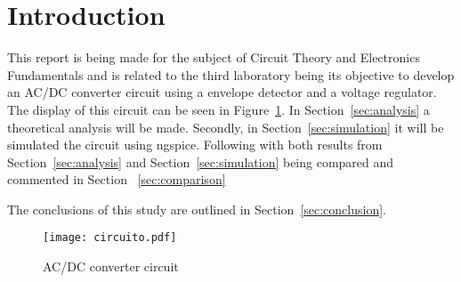 \section{Introduction}
\label{sec:introduction}


\hspace{0,5cm} This report is being made for the subject of Circuit Theory and Electronics Fundamentals and is related to the third laboratory being its objective to develop an AC/DC converter circuit using a envelope detector and a voltage regulator. The display of this circuit can be seen in Figure~\ref{fig:circuito}.
In Section~\ref{sec:analysis} a theoretical analysis will be made. Secondly, in Section~\ref{sec:simulation} it will be simulated the circuit using ngspice. Following with both results from Section~\ref{sec:analysis} and Section~\ref{sec:simulation} being compared and commented in Section ~\ref{sec:comparison}
\par The conclusions of this study are outlined in Section~\ref{sec:conclusion}.

\begin{figure}[H] \centering
\texttt{[image: circuito.pdf]}
\caption{AC/DC converter circuit}
\label{fig:circuito}
\end{figure}


